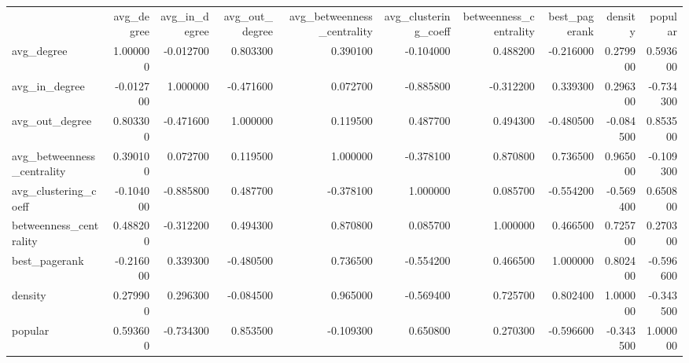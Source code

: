 \begin{tabular}{lrrrrrrrrr}
 & avg_degree & avg_in_degree & avg_out_degree & avg_betweenness_centrality & avg_clustering_coeff & betweenness_centrality & best_pagerank & density & popular \\
avg_degree & 1.000000 & -0.012700 & 0.803300 & 0.390100 & -0.104000 & 0.488200 & -0.216000 & 0.279900 & 0.593600 \\
avg_in_degree & -0.012700 & 1.000000 & -0.471600 & 0.072700 & -0.885800 & -0.312200 & 0.339300 & 0.296300 & -0.734300 \\
avg_out_degree & 0.803300 & -0.471600 & 1.000000 & 0.119500 & 0.487700 & 0.494300 & -0.480500 & -0.084500 & 0.853500 \\
avg_betweenness_centrality & 0.390100 & 0.072700 & 0.119500 & 1.000000 & -0.378100 & 0.870800 & 0.736500 & 0.965000 & -0.109300 \\
avg_clustering_coeff & -0.104000 & -0.885800 & 0.487700 & -0.378100 & 1.000000 & 0.085700 & -0.554200 & -0.569400 & 0.650800 \\
betweenness_centrality & 0.488200 & -0.312200 & 0.494300 & 0.870800 & 0.085700 & 1.000000 & 0.466500 & 0.725700 & 0.270300 \\
best_pagerank & -0.216000 & 0.339300 & -0.480500 & 0.736500 & -0.554200 & 0.466500 & 1.000000 & 0.802400 & -0.596600 \\
density & 0.279900 & 0.296300 & -0.084500 & 0.965000 & -0.569400 & 0.725700 & 0.802400 & 1.000000 & -0.343500 \\
popular & 0.593600 & -0.734300 & 0.853500 & -0.109300 & 0.650800 & 0.270300 & -0.596600 & -0.343500 & 1.000000 \\
\end{tabular}
